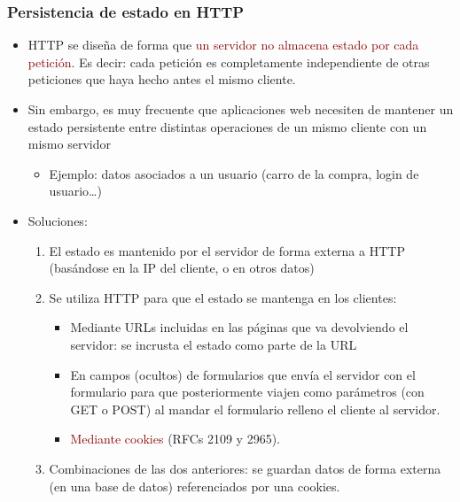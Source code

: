 \documentclass[hyperref={pdfpagelabels=true},ucs]{beamer}
\newcommand{\res}[1]{\textcolor{darkred}{#1}}
\begin{document}
\begin{frame}[shrink=15]
\frametitle{Persistencia de estado en HTTP}

\begin{itemize}
\item HTTP se diseña de forma que \res{un servidor no almacena estado
  por cada petición}. Es decir: cada petición es completamente
independiente de otras peticiones que haya hecho antes el mismo cliente.

\item Sin embargo, es muy frecuente que aplicaciones web necesiten de
  mantener un estado persistente entre distintas operaciones de un
  mismo cliente con un mismo servidor
  \begin{itemize}
  \item Ejemplo: datos asociados a un usuario (carro de la compra,
    login de usuario\ldots)
  \end{itemize}

\item Soluciones:

  \begin{enumerate}
  \item El estado es mantenido por el servidor de forma externa
    a HTTP (basándose en la IP del cliente, o en otros datos)
  \item Se utiliza HTTP para que el estado se mantenga en los
    clientes:
    \begin{itemize}
    \item Mediante URLs incluidas en las páginas que va
      devolviendo el servidor: se incrusta el estado como
      parte de la URL
    \item En campos (ocultos) de formularios que envía el servidor con
      el formulario para que posteriormente viajen como parámetros
      (con GET o POST) al mandar el formulario relleno el cliente al
      servidor.
    \item \res{Mediante cookies} (RFCs 2109 y 2965).
    \end{itemize}
  \item Combinaciones de las dos anteriores: se guardan datos de forma
    externa (en una base de datos) referenciados por una cookies.
  \end{enumerate}

\end{itemize}

\end{frame}

\end{document}
